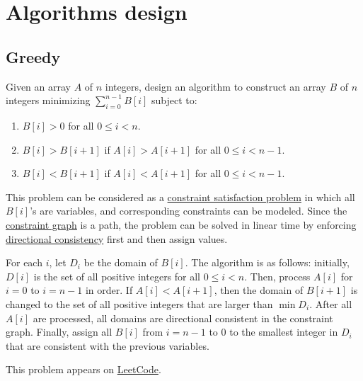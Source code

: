 \chapter{Algorithms design}

\section{Greedy}
\begin{Exercise}
Given an array $A$ of $n$ integers, design an algorithm to construct an array $B$ of $n$ integers minimizing $\sum_{i = 0}^{n-1} B[i]$ subject to:
\begin{enumerate}
\item $B[i] > 0$ for all $0 \leq i < n$.
\item $B[i] > B[i + 1]$ if $A[i] > A[i + 1]$ for all $0 \leq i < n - 1$.
\item $B[i] < B[i + 1]$ if $A[i] < A[i + 1]$ for all $0 \leq i < n - 1$.
\end{enumerate}
\end{Exercise}
\begin{Answer}
This problem can be considered as a \href{https://en.wikipedia.org/wiki/Constraint_satisfaction_problem}{constraint satisfaction problem} in which all $B[i]$'s are variables, and corresponding constraints can be modeled.
Since the \href{https://en.wikipedia.org/wiki/Constraint_graph}{constraint graph} is a path, the problem can be solved in linear time by enforcing \href{https://en.wikipedia.org/wiki/Local_consistency#Directional_consistency_and_satisfiability}{directional consistency} first and then assign values.

For each $i$, let $D_i$ be the domain of $B[i]$.
The algorithm is as follows:
initially, $D[i]$ is the set of all positive integers for all $0 \leq i < n$.
Then, process $A[i]$ for $i = 0$ to $i = n - 1$ in order.
If $A[i] < A[i + 1]$, then the domain of $B[i+1]$ is changed to the set of all positive integers that are larger than $\min D_i$.
After all $A[i]$ are processed, all domains are directional consistent in the constraint graph.
Finally, assign all $B[i]$ from $i = n - 1$ to $0$ to the smallest integer in $D_i$ that are consistent with the previous variables.
\begin{remark}
This problem appears on \href{https://leetcode.com/problems/candy/}{LeetCode}.
\end{remark}
\end{Answer}

